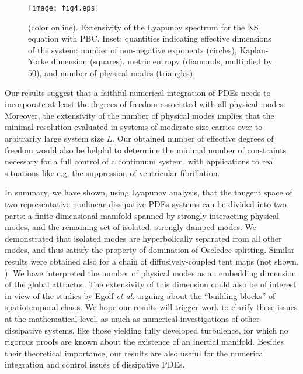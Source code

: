 \documentclass[prl,twocolumn,twoside,showpacs,superscriptaddress]{revtex4}
\begin{document}
\begin{figure}[t]
 \begin{center}
  \texttt{[image: fig4.eps]}
  \caption{(color online). 
Extensivity of the Lyapunov spectrum for the KS equation with PBC. 
Inset: quantities indicating effective dimensions of the system: number of non-negative exponents (circles), 
Kaplan-Yorke dimension (squares), 
metric entropy (diamonds, multiplied by $50$), 
and number of physical modes (triangles).}
  \label{fig:KSExtensivity}
 \end{center}
\end{figure}%

Our results suggest that a faithful numerical integration of PDEs needs to incorporate at least  
the degrees of freedom associated with all physical modes. 
Moreover, the extensivity of the number of physical modes implies that
the minimal resolution evaluated in systems of moderate size
carries over to arbitrarily large system size $L$.
Our obtained number of effective degrees of freedom would also be helpful to determine
the minimal number of constraints 
necessary for a full control of a continuum system, with applications to real situations like e.g. the 
suppression of ventricular fibrillation.
%

In summary, we have shown, using Lyapunov analysis, 
that the tangent space of two representative nonlinear dissipative PDEs 
systems can be divided into two parts:
 a finite dimensional manifold spanned by strongly interacting physical modes,
and the remaining set of isolated, strongly damped modes. We demonstrated
that isolated modes are hyperbolically separated from all other modes,
 and thus satisfy
the property of domination of Oseledec splitting.
Similar results were obtained
 also for a chain of diffusively-coupled tent maps (not shown, \cite{TBP}). 
We have interpreted the number of physical modes as an
 embedding dimension of the global attractor.
The extensivity of this dimension could also be of interest in view of 
the studies by Egolf {\it et al.}
 \cite{Egolf} arguing about the ``building blocks'' of spatiotemporal chaos.
We hope our results will trigger work to clarify these issues at the mathematical level,
as much as numerical investigations of other dissipative systems,
like those yielding fully developed turbulence, for which no rigorous proofs are known about
the existence of an inertial manifold.
Besides their theoretical importance,
our results are also useful for the numerical integration and control issues of dissipative PDEs.
\end{document}
